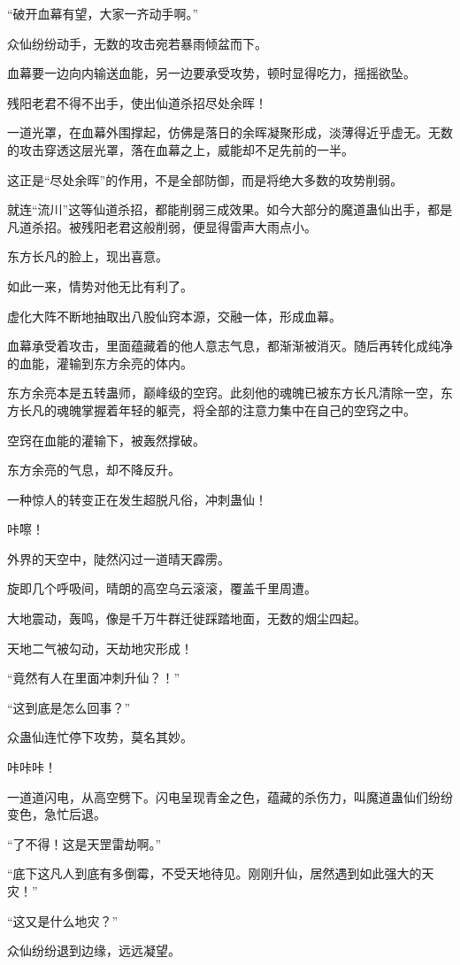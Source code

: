 \begin{this_body}
“破开血幕有望，大家一齐动手啊。”

众仙纷纷动手，无数的攻击宛若暴雨倾盆而下。

血幕要一边向内输送血能，另一边要承受攻势，顿时显得吃力，摇摇欲坠。

残阳老君不得不出手，使出仙道杀招尽处余晖！

一道光罩，在血幕外围撑起，仿佛是落日的余晖凝聚形成，淡薄得近乎虚无。无数的攻击穿透这层光罩，落在血幕之上，威能却不足先前的一半。

这正是“尽处余晖”的作用，不是全部防御，而是将绝大多数的攻势削弱。

就连“流川”这等仙道杀招，都能削弱三成效果。如今大部分的魔道蛊仙出手，都是凡道杀招。被残阳老君这般削弱，便显得雷声大雨点小。

东方长凡的脸上，现出喜意。

如此一来，情势对他无比有利了。

虚化大阵不断地抽取出八股仙窍本源，交融一体，形成血幕。

血幕承受着攻击，里面蕴藏着的他人意志气息，都渐渐被消灭。随后再转化成纯净的血能，灌输到东方余亮的体内。

东方余亮本是五转蛊师，巅峰级的空窍。此刻他的魂魄已被东方长凡清除一空，东方长凡的魂魄掌握着年轻的躯壳，将全部的注意力集中在自己的空窍之中。

空窍在血能的灌输下，被轰然撑破。

东方余亮的气息，却不降反升。

一种惊人的转变正在发生超脱凡俗，冲刺蛊仙！

咔嚓！

外界的天空中，陡然闪过一道晴天霹雳。

旋即几个呼吸间，晴朗的高空乌云滚滚，覆盖千里周遭。

大地震动，轰鸣，像是千万牛群迁徙踩踏地面，无数的烟尘四起。

天地二气被勾动，天劫地灾形成！

“竟然有人在里面冲刺升仙？！”

“这到底是怎么回事？”

众蛊仙连忙停下攻势，莫名其妙。

咔咔咔！

一道道闪电，从高空劈下。闪电呈现青金之色，蕴藏的杀伤力，叫魔道蛊仙们纷纷变色，急忙后退。

“了不得！这是天罡雷劫啊。”

“底下这凡人到底有多倒霉，不受天地待见。刚刚升仙，居然遇到如此强大的天灾！”

“这又是什么地灾？”

众仙纷纷退到边缘，远远凝望。


\end{this_body}
